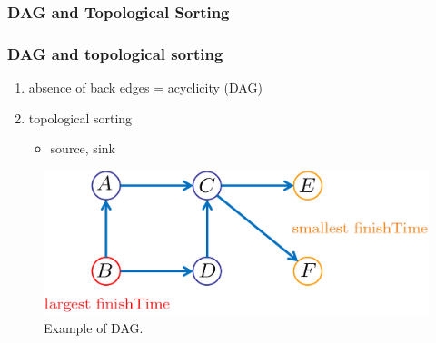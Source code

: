 \subsubsection{DAG and Topological Sorting}
\begin{frame}
  \frametitle{DAG and topological sorting}

  \begin{enumerate}
    \setlength{\itemsep}{0.20cm}

    \item absence of back edges = acyclicity (DAG)
    \item topological sorting
      \begin{itemize}
        \item source, sink
      \end{itemize}
  \end{enumerate}

  \begin{figure}
    \includegraphics[scale=0.40]{figure/bfs_dfs/DAG}
    \caption{{\scriptsize Example of DAG.}}
    \label{fig:activeinterval}
  \end{figure}
      
\end{frame}


%
%
%
%
%

